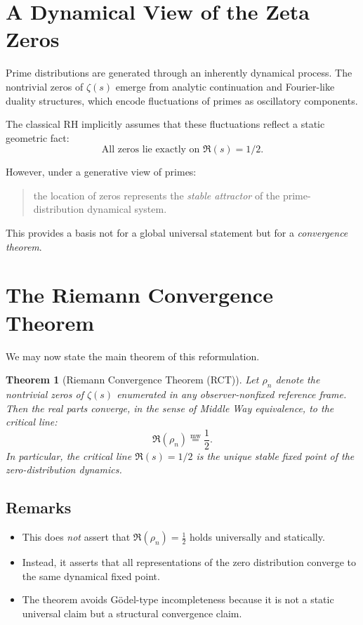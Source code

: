 \documentclass[12pt]{article}
\newcommand{\mweq}{\mathrel{\overset{\mathrm{mw}}{=}}}
\newtheorem{theorem}{Theorem}
\begin{document}
\section{A Dynamical View of the Zeta Zeros}

Prime distributions are generated through an inherently dynamical process.
The nontrivial zeros of $\zeta(s)$ emerge from analytic continuation and
Fourier-like duality structures, which encode fluctuations of primes
as oscillatory components.

The classical RH implicitly assumes that these fluctuations reflect
a static geometric fact:
\[
\text{All zeros lie exactly on } \Re(s)=1/2.
\]

However, under a generative view of primes:

\begin{quote}
the location of zeros represents the \emph{stable attractor} 
of the prime-distribution dynamical system.
\end{quote}

This provides a basis not for a global universal statement but for a 
\emph{convergence theorem}. 

\section{The Riemann Convergence Theorem}

We may now state the main theorem of this reformulation.

\begin{theorem}[Riemann Convergence Theorem (RCT)]
Let $\rho_n$ denote the nontrivial zeros of $\zeta(s)$ enumerated in any
observer-nonfixed reference frame. 
Then the real parts converge, in the sense of Middle Way equivalence, to 
the critical line:
\[
\Re(\rho_n) \mweq \frac{1}{2}.
\]
In particular, the critical line $\Re(s)=1/2$ is the unique stable
fixed point of the zero-distribution dynamics.
\end{theorem}

\subsection{Remarks}
\begin{itemize}
    \item This does \emph{not} assert that 
    $\Re(\rho_n)=\tfrac{1}{2}$ holds universally and statically.
    \item Instead, it asserts that all representations of the zero distribution
    converge to the same dynamical fixed point.
    \item The theorem avoids Gödel-type incompleteness because it is not a
    static universal claim but a structural convergence claim.
\end{itemize}
\end{document}
